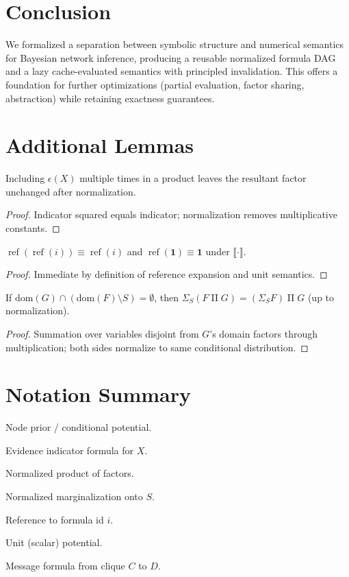 \documentclass[11pt]{article}
\newcommand{\fref}[1]{\operatorname{ref}(#1)}
\newcommand{\Prod}{\operatorname{\Pi}}
\newcommand{\Unit}{\mathbf{1}}
\newcommand{\Potf}{\Phi}
\newcommand{\Evid}{\epsilon}
\newcommand{\Den}[1]{\llbracket #1\rrbracket}
\newcommand{\Msg}[2]{\Psi(#1,#2)}
\begin{document}
\section{Conclusion}
We formalized a separation between symbolic structure and numerical semantics for Bayesian network inference, producing a reusable normalized formula DAG and a lazy cache-evaluated semantics with principled invalidation. This offers a foundation for further optimizations (partial evaluation, factor sharing, abstraction) while retaining exactness guarantees.

\appendix
\section{Additional Lemmas}
\begin{lemma}
Including $\Evid(X)$ multiple times in a product leaves the resultant factor unchanged after normalization.
\end{lemma}
\begin{proof}
Indicator squared equals indicator; normalization removes multiplicative constants.
\end{proof}

\begin{lemma}
$\fref{\fref{i}} \equiv \fref{i}$ and $\fref{\Unit} \equiv \Unit$ under $\Den{\cdot}$.
\end{lemma}
\begin{proof}
Immediate by definition of reference expansion and unit semantics.
\end{proof}

\begin{lemma}
If $\mathrm{dom}(G)\cap (\mathrm{dom}(F)\setminus S)=\emptyset$, then $\Sigma_S(F\Prod G) = (\Sigma_S F)\Prod G$ (up to normalization).
\end{lemma}
\begin{proof}
Summation over variables disjoint from $G$'s domain factors through multiplication; both sides normalize to same conditional distribution.
\end{proof}

\section{Notation Summary}
\begin{description}[leftmargin=2.2cm,labelsep=0.4cm]
	\item[$\Potf(X)$] Node prior / conditional potential.
	\item[$\Evid(X)$] Evidence indicator formula for $X$.
	\item[$\Prod(\cdot)$] Normalized product of factors.
	\item[$\Sigma_S$] Normalized marginalization onto $S$.
	\item[$\fref{i}$] Reference to formula id $i$.
	\item[$\Unit$] Unit (scalar) potential.
	\item[$\Msg{C}{D}$] Message formula from clique $C$ to $D$.
\end{description}
\end{document}
